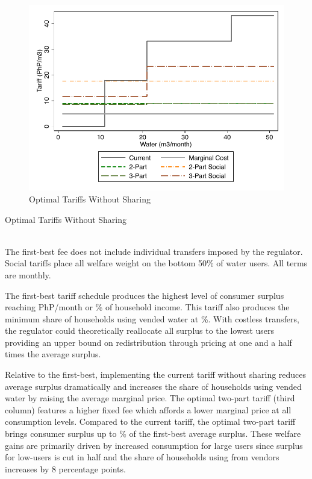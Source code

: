 \documentclass[12pt]{article}
\begin{document}
\begin{figure}[!htp]
\centering
\caption{Optimal Tariffs Without Sharing}\label{figure:optimaltariffnosharing}
\includegraphics{tables/no_shr_tariff_groups.pdf}  
\end{figure}


\begin{table}[!hbp]
\centering
\caption{Optimal Tariffs Without Sharing}\label{table:optimaltariffnosharing}
\resizebox{\textwidth}{!}{%

}	\\
\footnotesize{The first-best fee does not include individual transfers imposed by the regulator. \\  Social tariffs place all welfare weight on the bottom 50\% of water users. All terms are monthly.}
\end{table}

The first-best tariff schedule produces the highest level of consumer surplus reaching PhP/month or \unskip\% of household income.  This tariff also produces the minimum share of households using vended water at \unskip\%.  With costless transfers, the regulator could theoretically reallocate all surplus to the lowest users providing an upper bound on redistribution through pricing at one and a half times the average surplus.

Relative to the first-best, implementing the current tariff without sharing reduces average surplus dramatically and increases the share of households using vended water by raising the average marginal price.  The optimal two-part tariff (third column) features a higher fixed fee which affords a lower marginal price at all consumption levels.  Compared to the current tariff, the optimal two-part tariff brings consumer surplus up to \unskip\% of the first-best average surplus.  These welfare gains are primarily driven by increased consumption for large users since surplus for low-users is cut in half and the share of households using from vendors increases by 8 percentage points.
\end{document}
